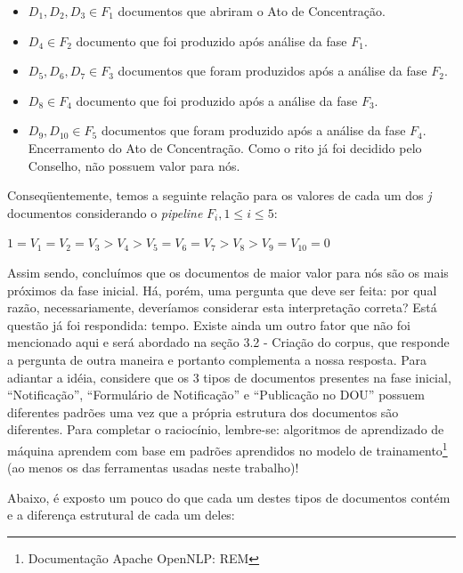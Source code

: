 \documentclass[11pt]{report}
\newcommand{\quotes}[1]{``#1''}
\begin{document}
\begin{itemize}
  \item $D_1, D_2, D_3 \in F_1$ documentos que abriram o Ato de Concentração.
  \item $D_4 \in F_2$ documento que foi produzido após análise da fase $F_1$.
  \item $D_5, D_6, D_7 \in F_3$ documentos que foram produzidos após a análise da fase $F_2$.
  \item $D_8 \in F_4$ documento que foi produzido após a análise da fase $F_3$.
  \item $D_9, D_{10} \in F_5$ documentos que foram produzido após a análise da fase $F_4$. Encerramento do Ato de Concentração. Como o rito já foi decidido pelo Conselho,
  não possuem valor para nós.
\end{itemize}

Conseqüentemente, temos a seguinte relação para os valores de cada um dos \textit{j} documentos considerando o \textit{pipeline} $F_i, 1 \leq i \leq 5$:
\begin{center}
  $1 = V_1 = V_2 = V_3 > V_4 > V_5 = V_6 = V_7 > V_8 > V_9 = V_{10} = 0$
\end{center}

Assim sendo, concluímos que os documentos de maior valor para nós são os mais próximos da fase inicial. Há, porém, uma pergunta que deve ser feita: por qual razão,
necessariamente, deveríamos considerar esta interpretação correta? Está questão já foi respondida: tempo. Existe ainda um outro fator que não foi mencionado aqui e será abordado
na seção 3.2 - Criação do corpus, que responde a pergunta de outra maneira e portanto complementa a nossa resposta. Para adiantar a idéia, considere que os 3 tipos de
documentos presentes na fase inicial, \quotes{Notificação}, \quotes{Formulário de Notificação} e \quotes{Publicação no DOU} possuem diferentes padrões uma vez que a própria
estrutura dos documentos são diferentes. Para completar o raciocínio, lembre-se: algoritmos de aprendizado de máquina aprendem com base em padrões aprendidos no modelo
de trainamento\footnote[6]{Documentação Apache OpenNLP: REM} (ao menos os das ferramentas usadas neste trabalho)!

Abaixo, é exposto um pouco do que cada um destes tipos de documentos contém e a diferença estrutural de cada um deles:
\end{document}
